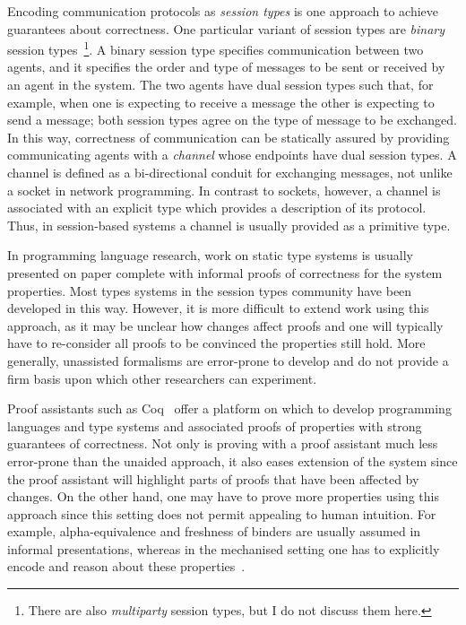 \documentclass{mpaper}
\begin{document}
Encoding communication protocols as \textit{session types} is one approach to
achieve guarantees about correctness. One particular variant of session types
are \textit{binary} session types~\footnote{There are also \textit{multiparty}
 session types, but I do not discuss them here.}. A binary session type
specifies communication between two agents, and it specifies the order and
type of messages to be sent or received by an agent in the system. The two
agents have dual session types such that, for example, when one is expecting
to receive a message the other is expecting to send a message; both session
types agree on the type of message to be exchanged. In this way, correctness
of communication can be statically assured by providing communicating agents
with a \textit{channel} whose endpoints have dual session types. A channel is
defined as a bi-directional conduit for exchanging messages, not unlike a
socket in network programming. In contrast to sockets, however, a channel is
associated with an explicit type which provides a description of its
protocol. Thus, in session-based systems a channel is usually provided as a
primitive type.

In programming language research, work on static type systems is usually
presented on paper complete with informal proofs of correctness for the system
properties. Most types systems in the session types community have been
developed in this way. However, it is more difficult to extend work using this
approach, as it may be unclear how changes affect proofs and one will
typically have to re-consider all proofs to be convinced the properties still
hold. More generally, unassisted formalisms are error-prone to develop and do
not provide a firm basis upon which other researchers can experiment.

Proof assistants such as Coq~\cite{Coq:manual} offer a platform on which to
develop programming languages and type systems and associated proofs of
properties with strong guarantees of correctness. Not only is proving with a
proof assistant much less error-prone than the unaided approach, it also eases
extension of the system since the proof assistant will highlight parts of
proofs that have been affected by changes. On the other hand, one may have to
prove more properties using this approach since this setting does not permit
appealing to human intuition. For example, alpha-equivalence and freshness of
binders are usually assumed in informal presentations, whereas in the
mechanised setting one has to explicitly encode and reason about these
properties~\cite{Aydemir:2005:MMM, Aydemir:2008:EFM}.
\end{document}
